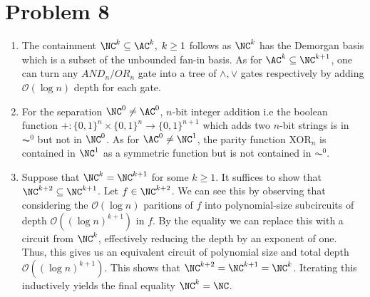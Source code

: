 \documentclass[12pt]{article}%
\begin{document}
\section{Problem 8}
\begin{enumerate}
  \item The containment $\NC^k \subseteq \AC^k, \; k \geq 1$ follows as $\NC^k$ has the Demorgan basis which is a subset of the unbounded fan-in basis. As for $\AC^{k} \subseteq \NC^{k+1}$, one can turn any $AND_n/OR_n$ gate into a tree of $\wedge,\vee$ gates respectively by adding $\mathcal{O}(\log n)$ depth for each gate.
  \item For the separation $\NC^0 \neq \AC^{0}$, $n$-bit integer addition i.e the boolean function $+:\{0,1\}^n \times \{0,1\}^n \rightarrow \{0,1\}^{n+1}$ which adds two $n$-bit strings is in $\AC^0$ but not in $\NC^0$. As for $\AC^0 \neq \NC^1$, the parity function XOR$_n$ is contained in $\NC^1$ as a symmetric function but is not contained in $\AC^0$.
  \item Suppose that $\NC^{k} = \NC^{k+1}$ for some $k \geq 1$. It suffices to show that $\NC^{k+2} \subseteq \NC^{k+1}$. Let $f \in \NC^{k+2}$. We can see this by observing that considering the $\mathcal{O}(\log n)$ paritions of $f$ into  polynomial-size subcircuits of depth $\mathcal{O}((\log n)^{k+1})$ in $f$.  By the equality we can replace this with a circuit from $\NC^k$, effectively reducing the depth by an exponent of one. Thus, this gives us an equivalent circuit of polynomial size and total depth $\mathcal{O}((\log n)^{k+1})$. This shows that $\NC^{k+2} = \NC^{k+1} = \NC^{k}$. Iterating this inductively yields the final equality $\NC^k = \NC$.
\end{enumerate}
\end{document}
